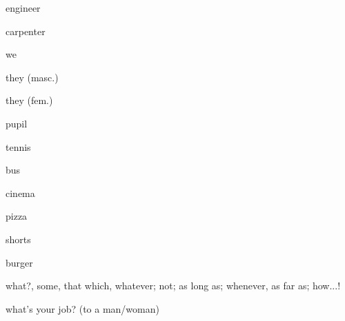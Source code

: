 \begin{flashcard}{\LARGE engineer}
\LARGE {}
\end{flashcard}
\begin{flashcard}{\LARGE carpenter}
\LARGE {}
\end{flashcard}
\begin{flashcard}{\LARGE we}
\LARGE {}
\end{flashcard}
\begin{flashcard}{\LARGE they (masc.)}
\LARGE {}
\end{flashcard}
\begin{flashcard}{\LARGE they (fem.)}
\LARGE {}
\end{flashcard}
\begin{flashcard}{\LARGE pupil}
\LARGE {}
\end{flashcard}
\begin{flashcard}{\LARGE tennis}
\LARGE {}
\end{flashcard}
\begin{flashcard}{\LARGE bus}
\LARGE {}
\end{flashcard}
\begin{flashcard}{\LARGE cinema}
\LARGE {}
\end{flashcard}
\begin{flashcard}{\LARGE pizza}
\LARGE {}
\end{flashcard}
\begin{flashcard}{\LARGE shorts}
\LARGE {}
\end{flashcard}
\begin{flashcard}{\LARGE burger}
\LARGE {}
\end{flashcard}
\begin{flashcard}{\LARGE what?, some, that which, whatever; not; as long as; whenever, as far as; how...!}
\LARGE {}
\end{flashcard}
\begin{flashcard}{\LARGE what's your job? (to a man/woman)}
\LARGE {}
\end{flashcard}
